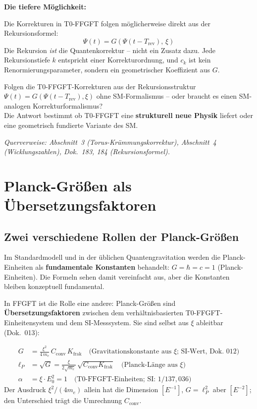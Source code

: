 \textbf{Die tiefere Möglichkeit:}

Die Korrekturen in T0-FFGFT folgen möglicherweise direkt aus
der Rekursionsformel:
\begin{equation}
    \Psi(t) = G\!\left(\Psi(t - T_{\text{rev}}),\, \xi\right)
\end{equation}
Die Rekursion \emph{ist} die Quantenkorrektur -- nicht ein Zusatz
dazu. Jede Rekursionstiefe $k$ entspricht einer Korrekturordnung,
und $c_k$ ist kein Renormierungsparameter, sondern ein geometrischer
Koeffizient aus $G$.

\begin{predbox}
Folgen die T0-FFGFT-Korrekturen aus der Rekursionsstruktur
$\Psi(t) = G(\Psi(t-T_{\text{rev}}), \xi)$ ohne SM-Formalismus --
oder braucht es einen SM-analogen Korrekturformalismus?\\[4pt]
Die Antwort bestimmt ob T0-FFGFT eine \textbf{strukturell neue
Physik} liefert oder eine geometrisch fundierte Variante des SM.
\end{predbox}

\noindent\textit{Querverweise: Abschnitt~3 (Torus-Krümmungskorrektur),
Abschnitt~4 (Wicklungszahlen), Dok.~183, 184 (Rekursionsformel).}

\section{Planck-Größen als Übersetzungsfaktoren}

\subsection{Zwei verschiedene Rollen der Planck-Größen}

Im Standardmodell und in der üblichen Quantengravitation werden
die Planck-Einheiten als \textbf{fundamentale Konstanten} behandelt:
$G = \hbar = c = 1$ (Planck-Einheiten). Die Formeln sehen damit
vereinfacht aus, aber die Konstanten bleiben konzeptuell fundamental.

In FFGFT ist die Rolle eine andere: Planck-Größen sind
\textbf{Übersetzungsfaktoren} zwischen dem verhältnisbasierten
T0-FFGFT-Einheitensystem und dem SI-Messsystem. Sie sind selbst aus
$\xi$ ableitbar (Dok.~013):

\begin{align}
    G &= \frac{\xi^2}{4\,m_e}\,C_{\text{conv}}\,K_{\text{frak}}
    \quad \text{(Gravitationskonstante aus } \xi\text{; SI-Wert, Dok.~012)} \\[4pt]
    \ell_P &= \sqrt{G} = \frac{\xi}{2\sqrt{m_e}}\,\sqrt{C_{\text{conv}}K_{\text{frak}}}
    \quad \text{(Planck-Länge aus } \xi\text{)} \\[4pt]
    \alpha &= \xi \cdot E_0^2 = 1
    \quad \text{(T0-FFGFT-Einheiten; SI: } 1/137{,}036\text{)}
\end{align}
Der Ausdruck $\xi^2/(4m_e)$ allein hat die Dimension $[E^{-1}]$,
$G = \ell_P^2$ aber $[E^{-2}]$; den Unterschied trägt die Umrechnung
$C_{\text{conv}}$.

